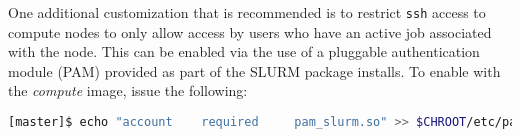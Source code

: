 One additional customization that is recommended is to restrict \texttt{ssh} access to
compute nodes to only allow access by users who have an
active job associated with the node. This can be enabled via the use of a
pluggable authentication module (PAM) provided as part of the SLURM package
installs. To enable with the {\em compute} image, issue the following:

\begin{lstlisting}[language=bash,keywords={},upquote=true]
[master]$ echo "account    required     pam_slurm.so" >> $CHROOT/etc/pam.d/sshd
\end{lstlisting}
